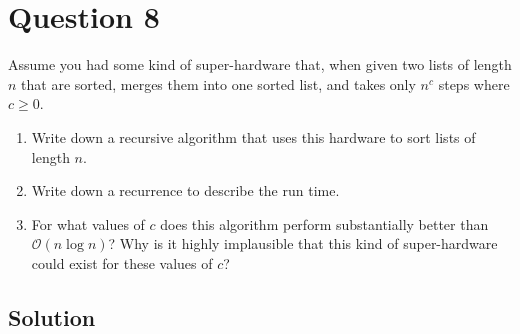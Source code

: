 
\section*{Question 8}
Assume you had some kind of super-hardware that, when given two lists of length $n$ that are sorted, merges them into one sorted list, and takes only $n^c$ steps where $c \geq 0$.

\begin{enumerate}[label=(\alph*)]
\item Write down a recursive algorithm that uses this hardware to sort lists of length $n$.
\item Write down a recurrence to describe the run time.
\item For what values of $c$ does this algorithm perform substantially better than $\mathcal{O}(n \log n)$? Why is it highly implausible that this kind of super-hardware could exist for these values of $c$?
\end{enumerate}

\subsection*{Solution}

